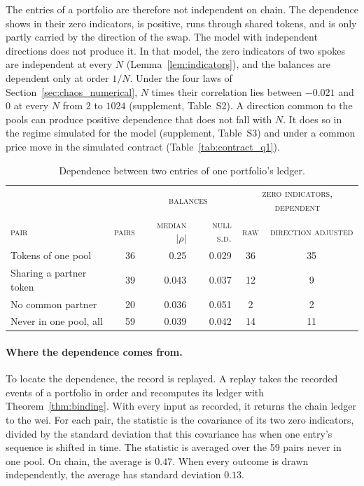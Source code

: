 \documentclass[11pt,a4paper]{article}
\DeclareRobustCommand{\thd}[1]{{\scshape\addfontfeatures{LetterSpace=1.5}\MakeLowercase{#1}}}
\theoremstyle{siphon}
\begin{document}
The entries of a portfolio are therefore not independent on chain. The dependence shows in their zero indicators, is positive, runs through shared tokens, and is only partly carried by the direction of the swap. The model with independent directions does not produce it. In that model, the zero indicators of two spokes are independent at every $N$ (Lemma~\ref{lem:indicators}), and the balances are dependent only at order $1/N$. Under the four laws of Section~\ref{sec:chaos_numerical}, $N$ times their correlation lies between $-0.021$ and $0$ at every $N$ from $2$ to $1024$ (supplement, Table~S2). A direction common to the pools can produce positive dependence that does not fall with $N$. It does so in the regime simulated for the model (supplement, Table~S3) and under a common price move in the simulated contract (Table~\ref{tab:contract_q1}).
\begin{table}[!htb]
\centering
\caption{Dependence between two entries of one portfolio's ledger.}
\label{tab:chaos_v9}
\begin{tabular}{@{}lrrrcc@{}}
\toprule
 & & \multicolumn{2}{c}{\thd{Balances}} & \multicolumn{2}{c}{\thd{Zero indicators, dependent}}  \\
\thd{Pair} & \thd{Pairs} & \thd{Median} $|\rho|$ & \thd{Null s.d.} & \thd{Raw} & \thd{Direction adjusted}  \\
\midrule
Tokens of one pool         & 36 & 0.25  & 0.029 & 36 & 35 \\
Sharing a partner token    & 39 & 0.043 & 0.037 & 12 & \phantom{0}9 \\
No common partner          & 20 & 0.036 & 0.051 & \phantom{0}2 & \phantom{0}2 \\
Never in one pool, all     & 59 & 0.039 & 0.042 & 14 & 11 \\
\bottomrule
\end{tabular}
\end{table}
\paragraph{Where the dependence comes from.}
To locate the dependence, the record is replayed. A replay takes the recorded events of a portfolio in order and recomputes its ledger with Theorem~\ref{thm:binding}. With every input as recorded, it returns the chain ledger to the wei. For each pair, the statistic is the covariance of its two zero indicators, divided by the standard deviation that this covariance has when one entry's sequence is shifted in time. The statistic is averaged over the 59 pairs never in one pool. On chain, the average is $0.47$. When every outcome is drawn independently, the average has standard deviation $0.13$.
\end{document}
